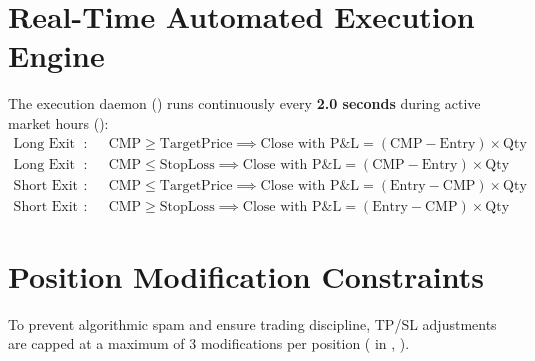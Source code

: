 \section{Real-Time Automated Execution Engine}
The execution daemon () runs continuously every \textbf{2.0 seconds} during active market hours ():
\begin{align}
    \text{Long Exit (TP Hit)}: &\quad \mathrm{CMP} \ge \mathrm{TargetPrice} \implies \text{Close with } \text{P\&L} = (\mathrm{CMP} - \mathrm{Entry}) \times \mathrm{Qty} \\
    \text{Long Exit (SL Hit)}: &\quad \mathrm{CMP} \le \mathrm{StopLoss} \implies \text{Close with } \text{P\&L} = (\mathrm{CMP} - \mathrm{Entry}) \times \mathrm{Qty} \\
    \text{Short Exit (TP Hit)}: &\quad \mathrm{CMP} \le \mathrm{TargetPrice} \implies \text{Close with } \text{P\&L} = (\mathrm{Entry} - \mathrm{CMP}) \times \mathrm{Qty} \\
    \text{Short Exit (SL Hit)}: &\quad \mathrm{CMP} \ge \mathrm{StopLoss} \implies \text{Close with } \text{P\&L} = (\mathrm{Entry} - \mathrm{CMP}) \times \mathrm{Qty}
\end{align}

\section{Position Modification Constraints}
To prevent algorithmic spam and ensure trading discipline, TP/SL adjustments are capped at a maximum of 3 modifications per position ( in , ).
